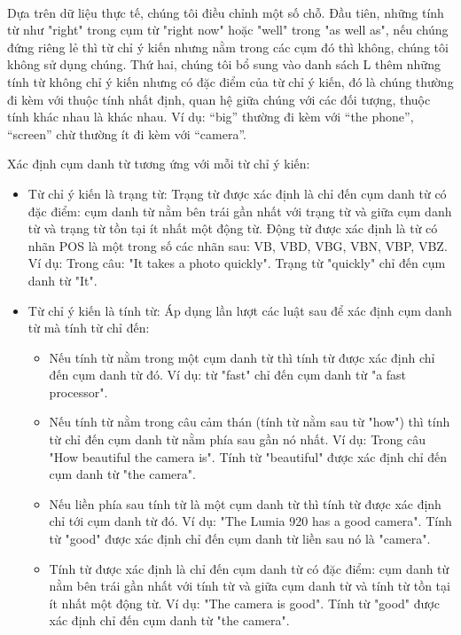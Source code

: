 \documentclass[12pt]{report}
\begin{document}
					\\ Dựa trên dữ liệu thực tế, chúng tôi điều chỉnh một số chỗ. Đầu tiên, những tính từ như "right" trong cụm từ "right now" hoặc "well" trong "as well as", nếu chúng đứng riêng lẻ thì từ chỉ ý kiến nhưng nằm trong các cụm đó thì không, chúng tôi không sử dụng chúng. Thứ hai, chúng tôi bổ sung vào danh sách L thêm những tính từ không chỉ ý kiến nhưng có đặc điểm của từ chỉ ý kiến, đó là chúng thường đi kèm với thuộc tính nhất định, quan hệ giữa chúng với các đối tượng, thuộc tính khác nhau là khác nhau. Ví dụ: “big” thường đi kèm với “the phone”, “screen” chừ thường ít đi kèm với “camera”.
					\par Xác định cụm danh từ tương ứng với mỗi từ chỉ ý kiến:
					\begin{itemize}
						\item{Từ chỉ ý kiến là trạng từ:
						Trạng từ được xác định là chỉ đến cụm danh từ có đặc điểm: cụm danh từ nằm bên trái gần nhất với trạng từ và giữa cụm danh từ và trạng từ tồn tại ít nhất một động từ. Động từ được xác định là từ có nhãn POS là một trong số các nhãn sau: VB, VBD, VBG, VBN, VBP, VBZ. Ví dụ: Trong câu: "It takes a photo quickly". Trạng từ "quickly" chỉ đến cụm danh từ "It".}
						\item{Từ chỉ ý kiến là tính từ: 
						Áp dụng lần lượt các luật sau để xác định cụm danh từ mà tính từ chỉ đến:
							\begin{itemize}
								\item{Nếu tính từ nằm trong một cụm danh từ thì tính từ được xác định chỉ đến cụm danh từ đó. Ví dụ: từ "fast" chỉ đến cụm danh từ "a fast processor".}
								\item{Nếu tính từ nằm trong câu cảm thán (tính từ nằm sau từ "how") thì tính từ chỉ đến cụm danh từ nằm phía sau gần nó nhất. Ví dụ: Trong câu "How beautiful the camera is". Tính từ "beautiful" được xác định chỉ đến cụm danh từ "the camera".}
								\item{Nếu liền phía sau tính từ là một cụm danh từ thì tính từ được xác định chỉ tới cụm danh từ đó. Ví dụ: "The Lumia 920 has a good camera". Tính từ "good" được xác định chỉ đến cụm danh từ liền sau nó là "camera".}
								\item{Tính từ được xác định là chỉ đến cụm danh từ có đặc điểm: cụm danh từ nằm bên trái gần nhất với tính từ và giữa cụm danh từ và tính từ tồn tại ít nhất một động từ. Ví dụ: "The camera is good". Tính từ "good" được xác định chỉ đến cụm danh từ "the camera".}
							\end{itemize}}
					\end{itemize}
\end{document}
